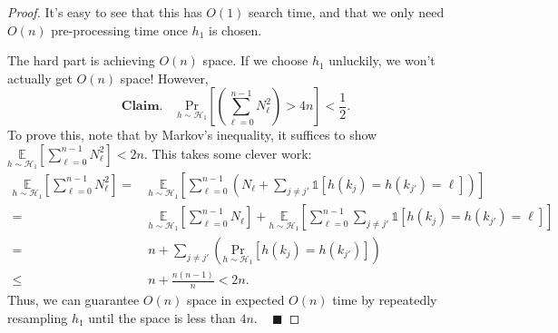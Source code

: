 \begin{proof}
    It's easy to see that this has $O(1)$ search time, and that we only need $O(n)$ pre-processing time once $h_1$ is chosen.

    The hard part is achieving $O(n)$ space.  If we choose $h_1$ unluckily, we won't actually get $O(n)$ space!  However,
    \[ \textbf{Claim.} ~~~~~ \underset{h \sim \mathcal{H}_1}{\mathrm{Pr}} \left [ \left(\sum_{\ell = 0}^{n - 1} N_{\ell}^2\right) > 4n \right ] < \dfrac{1}{2}. \]
    To prove this, note that by Markov's inequality, it suffices to show $\underset{h \sim \mathcal{H}_1}{\mathbb{E}}\left [ \sum_{\ell = 0}^{n - 1} N_{\ell}^2 \right ] < 2n$.  This takes some clever work:
    \begin{align*}
        \underset{h \sim \mathcal{H}_1}{\mathbb{E}} \left [ \sum_{\ell = 0}^{n - 1} N_{\ell}^2 \right ] = \ & \underset{h \sim \mathcal{H}_1}{\mathbb{E}} \left [ \sum_{\ell = 0}^{n - 1} \left ( N_{\ell} + \sum_{j \neq j'} \mathds{1}\left [ h(k_j) = h(k_{j'}) = \ell \right ] \right ) \right ] \\
        = \ & \underset{h \sim \mathcal{H}_1}{\mathbb{E}}\left [ \sum_{\ell = 0}^{n - 1} N_{\ell} \right ] + \underset{h \sim \mathcal{H}_1}{\mathbb{E}} \left [  \sum_{\ell = 0}^{n - 1}  \sum_{j \neq j'} \mathds{1}\left [ h(k_j) = h(k_{j'}) = \ell \right ] \right ] \\
        = \ & n + \sum_{j \neq j'} \left(\underset{h \sim \mathcal{H}_1}{\mathrm{Pr}}[h(k_j) = h(k_{j'})] \right) \\
        \leq \ & n + \frac{n(n - 1)}{n} < 2n.
    \end{align*}
    Thus, we can guarantee $O(n)$ space in expected $O(n)$ time by repeatedly resampling $h_1$ until the space is less than $4n$. ~ $\blacksquare$
\end{proof}


